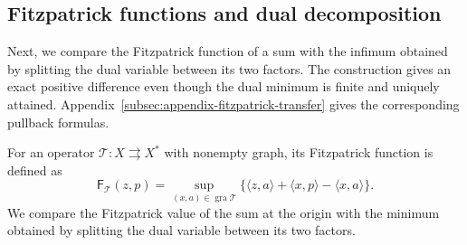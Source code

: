 \documentclass[11pt]{article}
\newcommand{\gra}{\operatorname{gra}}
\newcommand{\pair}[2]{\langle #1,#2\rangle}
\theoremstyle{definition}
\theoremstyle{remark}
\begin{document}
\subsection{Fitzpatrick functions and dual decomposition}
\label{subsec:main-fitzpatrick}
Next, we compare the Fitzpatrick function of a sum with the infimum obtained by splitting the dual variable between its two factors. The construction gives an exact positive difference even though the dual minimum is finite and uniquely attained. Appendix~\ref{subsec:appendix-fitzpatrick-transfer} gives the corresponding pullback formulas.

\label{subsec:fitzpatrick-values}

For an operator $\mathcal T:X\rightrightarrows X^*$ with nonempty graph, its Fitzpatrick function is defined as
\begin{equation}
\mathsf F_{\mathcal T}(z,p)
=\sup_{(x,a)\in\gra\mathcal T}
\{\pair{z}{a}+\pair{x}{p}-\pair{x}{a}\}.
\label{eq:cor-fitzpatrick}
\end{equation}
We compare the Fitzpatrick value of the sum at the origin with the minimum obtained by splitting the dual variable between its two factors.
\end{document}
